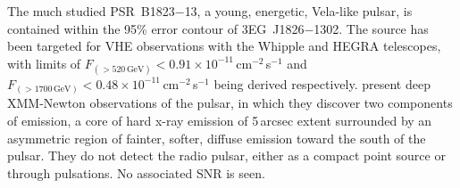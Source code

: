 The much studied PSR~B1823$-$13, a young, energetic, Vela-like pulsar,
is contained within the 95\% error contour of 3EG~J1826$-$1302. The
source has been targeted for VHE observations with the Whipple
\citep[see][and its references]{REF::HALL::ICRC2001} and HEGRA
\citep[identified as PSR~J1826-1334]{REF::AHARONIAN::AA2002}
telescopes, with limits of
$F_{(>520\,\mathrm{GeV})}<0.91\times10^{-11}$\,cm$^{-2}$\,s$^{-1}$ and
$F_{(>1700\,\mathrm{GeV})}<0.48\times10^{-11}$\,cm$^{-2}$\,s$^{-1}$
being derived respectively. \citet{REF::GAENSLER::APJ2003} present
deep XMM-Newton observations of the pulsar, in which they discover two
components of emission, a core of hard x-ray emission of 5\,arcsec
extent surrounded by an asymmetric region of fainter, softer, diffuse
emission toward the south of the pulsar. They do not detect the radio
pulsar, either as a compact point source or through pulsations. No
associated SNR is seen.

